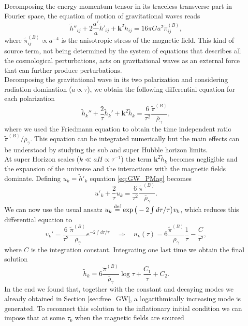 {Decomposing the energy momentum tensor in its traceless transverse part in Fourier space, the equation of motion of gravitational waves reads  
\begin{equation*}
     \tilde h''_{ij}+2\frac{a'}{a}\tilde h'_{ij}+\boldsymbol{k}^2 \tilde h_{ij}=16\pi G a^2\tilde\pi^{(B)}_{ij},
\end{equation*}
where $\tilde\pi^{(B)}_{ij}\propto a^{-4}$ is the anisotropic stress of the magnetic field. This kind of source term, not being determined by the system of equations that describes all the cosmological perturbations, acts on gravitational waves as an external force that can further produce perturbations.\\Decomposing the gravitational wave in its two polarization and considering radiation domination ($a \propto\tau$), we obtain the following differential equation for each polarization
\begin{equation}\label{eq:GW_PMag}
\tilde h_k''+\frac{2}{\tau}\tilde h_k'+\mathbf k^2\tilde h_k=\frac{6}{\tau^2}\frac{\tilde\pi^{(B)}}{\bar \rho_\gamma},
\end{equation}
where we used the Friedmann equation to obtain the time independent ratio $\tilde\pi^{(B)}/\bar\rho_\gamma$. This equation can be integrated numerically but the main effects can be understood by studying the sub and super Hubble horizon limits.\\ At super Horizon scales ($k\ll aH\propto\tau^{-1}$) the term $\mathbf k^2\tilde h_k$ becomes negligible and the expansion of the universe and the interactions with the magnetic fields dominate. Defining $u_k=\tilde h'_k$ equation \eqref{eq:GW_PMag} becomes
$$u'_k+\frac{2}{\tau}u_k=\frac{6}{\tau^2}\frac{\tilde\pi^{(B)}}{\bar\rho_\gamma}.$$
We can now use the usual ansatz $u_k\stackrel{\text{def}}{=}\exp\big(-2\int d\tau/\tau\big)v_k$, which reduces this differential equation to 
$$v_k'=\frac{6}{\tau^2}\frac{\tilde\pi^{(B)}}{\bar\rho_\gamma}e^{-2\int d\tau/\tau}\quad \Rightarrow\quad u_k(\tau)=6\frac{\tilde\pi^{(B)}}{\bar\rho_\gamma}\frac{1}{\tau}-\frac{C}{\tau^2},$$
where $C$ is the integration constant. Integrating one last time we obtain the final solution 
\begin{equation}
    \tilde h_k=6\frac{\tilde\pi^{(B)}}{\bar\rho_\gamma}\log\tau+\frac{C_1}{\tau} + C_2. \label{eq:SH_PM_PGWs}
\end{equation}
In the end we found that, together with the constant and decaying modes we already obtained in Section \ref{sec:free_GW}, a logarithmically increasing mode is generated. To reconnect this solution to the inflationary initial condition we can impose that at some $\tau_0$ when the magnetic fields are sourced 
}
